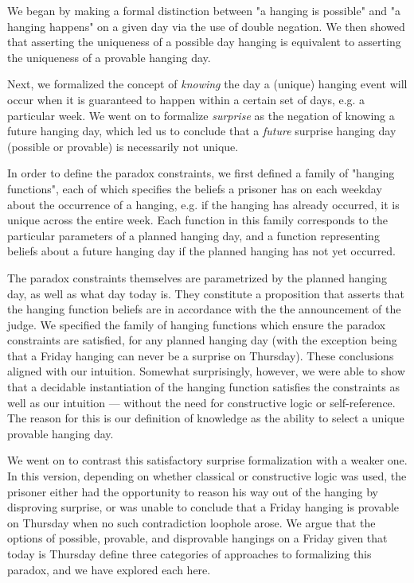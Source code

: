\documentclass[runningheads]{llncs}
\begin{document}
We began by making a formal distinction between "a hanging is possible" and "a hanging
happens" on a given day via the use of double negation. We then showed that
asserting the uniqueness of a possible day hanging is equivalent to asserting the uniqueness of a provable hanging day.

Next, we formalized the concept of \emph{knowing} the day a (unique) hanging event will occur
when it is guaranteed to happen within a certain set of days, e.g. a particular week.
We went on to formalize \emph{surprise} as the negation of
knowing a future hanging day, which led us to conclude that a \emph{future} surprise
hanging day (possible or provable) is necessarily not unique.

In order to define the paradox constraints, we first defined a family of "hanging functions",
each of which specifies the beliefs a prisoner has on each weekday about the occurrence
of a hanging, e.g. if the hanging has already occurred, it is
unique across the entire week. Each function in this family corresponds to
the particular parameters of
a planned hanging day, and a function representing beliefs about a future
hanging day if the planned hanging has not yet occurred.

The paradox constraints themselves are parametrized by the planned hanging day, as
well as what day today is. They constitute a proposition that asserts that
the hanging function beliefs are in accordance with the the announcement of the judge.
We specified the family of hanging functions which ensure the paradox constraints
are satisfied, for any planned hanging day (with the exception being that a Friday
hanging can never be a surprise on Thursday). These conclusions aligned with our
intuition. Somewhat surprisingly, however, we were able to show that a decidable
instantiation of the hanging function satisfies the constraints as well as
our intuition --- without the need for constructive logic or self-reference.
The reason for this is our definition of knowledge as the ability to select
a unique provable hanging day.

We went on to contrast this satisfactory surprise formalization with a weaker one.
In this version, depending on whether classical or constructive logic was used,
the prisoner either had the opportunity to reason his way out of the
hanging by disproving surprise, or was unable to conclude that a Friday hanging is provable on Thursday
when no such contradiction loophole arose. We argue that the options of possible,
provable, and disprovable hangings on a Friday given that today is Thursday define three categories of
approaches to formalizing this paradox, and we have explored each here.
\end{document}
